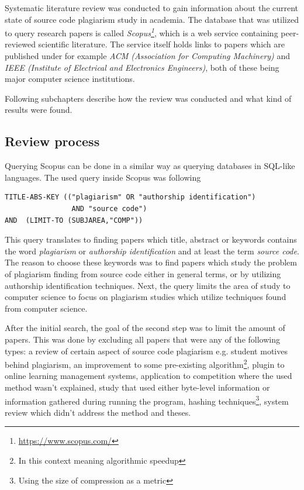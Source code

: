 Systematic literature review was conducted to gain information about the current state of source code plagiarism study in academia. The database that was utilized to query research papers is called \emph{Scopus\footnote{\url{https://www.scopus.com/}}}, which is a web service containing peer-reviewed scientific literature. The service itself holds links to papers which are published under for example \emph{ACM (Association for Computing Machinery)} and \emph{IEEE (Institute of Electrical and Electronics Engineers)}, both of these being major computer science institutions. 

Following subchapters describe how the review was conducted and what kind of results were found. 

\subsection{Review process}

Querying Scopus can be done in a similar way as querying databases in SQL-like languages. The used query inside Scopus was following
\begin{verbatim}
TITLE-ABS-KEY (("plagiarism" OR "authorship identification")  
                AND "source code") 
AND  (LIMIT-TO (SUBJAREA,"COMP"))
\end{verbatim}

\noindent
This query translates to finding papers which title, abstract or keywords contains the word \emph{plagiarism} or \emph{authorship identification} and at least the term \emph{source code}. The reason to choose these keywords was to find papers which study the problem of plagiarism finding from source code either in general terms, or by utilizing authorship identification techniques. Next, the query limits the area of study to computer science to focus on plagiarism studies which utilize techniques found from computer science.

After the initial search, the goal of the second step was to limit the amount of papers. This was done by excluding all papers that were any of the following types: a review of certain aspect of source code plagiarism e.g. student motives behind plagiarism, an improvement to some pre-existing algorithm\footnote{In this context meaning algorithmic speedup}, plugin to online learning management systems, application to competition where the used method wasn't explained, study that used either byte-level information or information gathered during running the program, hashing techniques\footnote{Using the size of compression as a metric}, system review which didn't address the method and theses. 

